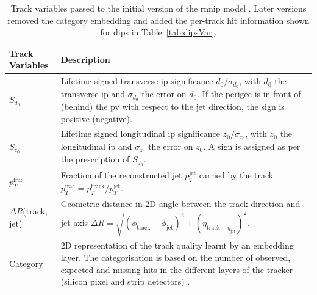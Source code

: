\begin{table}[h!]
  \begin{center}
      \begin{tabular}{C{3cm}|C{13cm}} 
      	 \hline \hline
          Track Variables & Description  \\ \hline \hline
          $S_{d_0}$      & Lifetime signed transverse \gls{ip} significance $d_0 / \sigma_{d_0}$, with $d_0$ the transverse \gls{ip} and $\sigma_{d_0}$ the error on $d_0$. If the perigee is in front of (behind) the \gls{pv} with respect to the jet direction, the sign is positive (negative). \\ \hline
          $S_{z_0}$      & Lifetime signed longitudinal \gls{ip} significance $z_0 / \sigma_{z_0}$, with $z_0$ the longitudinal \gls{ip} and $\sigma_{z_0}$ the error on $z_0$. A sign is assigned as per the prescription of $S_{d_0}$. \\ \hline
          $p_T^{\textrm{frac}}$   & Fraction of the reconstructed jet $p_T^{\textrm{jet}}$ carried by the track $p_T^{\textrm{frac}} = p_T^{\textrm{track}} / p_T^{\textrm{jet}}$. \\ \hline
          $\Delta R$(track, jet) & Geometric distance in 2D angle between the track direction and jet axis $\Delta R = \sqrt{(\phi_{\textrm{track}} - \phi_{\textrm{jet}})^2 + (\eta_{\textrm{track} - \eta_{\textrm{jet}}})^2}$. \\ \hline
          Category       & 2D representation of the track quality learnt by an embedding layer. The categorisation is based on the number of observed, expected and missing hits in the different layers of the tracker (silicon pixel and strip detectors) \cite{ATL-PHYS-PUB-2015-022}.  \\ \hline
      \end{tabular}
    \caption{Track variables passed to the initial version of the \gls{rnnip} model \cite{ATL-PHYS-PUB-2017-003}. Later versions removed the category embedding and added the per-track hit information shown for \gls{dips} in Table~\ref{tab:dipsVar}.}
    \label{tab:rnnipVar}
  \end{center}
\end{table}

